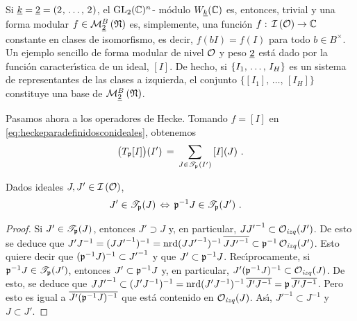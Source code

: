 Si $\peso{k}=\peso 2=(\lista[\null]{2}{\null})$, el $\GL_{2}(\bb{C})^{n}$-%
m\'{o}dulo $W_{\peso{k}}(\bb{C})$ es, entonces, trivial y una forma modular
$f\in\modularH[B]{2}{\frak{N}}$ es, simplemente, una funci\'{o}n
$f:\,\ideales{\cal{O}}\rightarrow\bb{C}$ constante en clases de isomorfismo, es
decir, $f(bI)=f(I)$ para todo $b\in B^{\times}$.
Un ejemplo sencillo de forma modular de nivel $\cal{O}$ y peso $\peso 2$
est\'{a} dado por la funci\'{o}n caracter\'{\i}stica de un ideal, $[I]$. De
hecho, si $\{\lista{I}{H}\}$ es un sistema de representantes de las clases a
izquierda, el conjunto $\{[I_{1}],\,\dots,\,[I_{H}]\}$ constituye una base de
$\modularH[B]{2}{\frak{N}}$.

Pasamos ahora a los operadores de Hecke. Tomando $f=[I]$ en
\eqref{eq:heckeparadefinidosconideales}, obtenemos
\begin{equation}
	\label{eq:heckeparadefinidosconidealespesoparalelo}
	\big(T_{\frak p}[I]\big)(I') \,=\,
		\sum_{J\in\mathscr T_{\frak p}(I')}\,[I](J)
	\text{ .}
\end{equation}
%

\begin{lemaHeckeParaDefinidaNoEsAutoadjunto}
	\label{lema:heckeparadefinidanoesautoadjunto}
	Dados ideales $J,J'\in\ideales{\cal O}$,
	\begin{align*}
		J'\in\mathscr T_{\frak p}(J) & \,\Leftrightarrow\,
			\frak p^{-1}J\in\mathscr T_{\frak p}(J')
		\text{ .}
	\end{align*}
\end{lemaHeckeParaDefinidaNoEsAutoadjunto}

\begin{proof}
	Si $J'\in\mathscr T_{\frak p}(J)$, entonces $J'\supset J$ y, en
	particular, $J{J'}^{-1}\subset\Oizq(J')$. De esto se deduce que
	\begin{math}
		J'J^{-1}=(J{J'}^{-1})^{-1}=
			\nrd(J{J'}^{-1})^{-1}\,\lconj{J{J'}^{-1}}\subset
			\frak p^{-1}\,\Oizq(J')
	\end{math}. Esto quiere decir que
	$(\frak p^{-1}J)^{-1}\subset {J'}^{-1}$ y que
	$J'\subset\frak p^{-1}J$.
	Rec\'{\i}procamente, si $\frak p^{-1}J\in\mathscr T_{\frak p}(J')$,
	entonces $J'\subset\frak p^{-1}J$ y, en particular,
	$J'(\frak p^{-1}J)^{-1}\subset\Oizq(J)$. De esto, se deduce que
	\begin{math}
		J{J'}^{-1}\subset (J'J^{-1})^{-1}=
			\nrd(J'J^{-1})^{-1}\,\lconj{J'J^{-1}}=
			\frak p\,\lconj{J'J^{-1}}
	\end{math}. Pero esto es igual a $\lconj{J'(\frak p^{-1}J)^{-1}}$ que
	est\'{a} contenido en $\Oizq(J)$. As\'{\i}, ${J'}^{-1}\subset J^{-1}$ y
	$J\subset J'$.
\end{proof}

